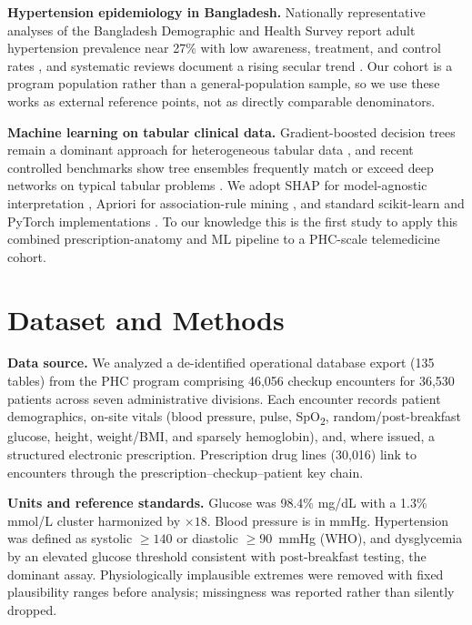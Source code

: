 \documentclass[conference]{IEEEtran}
\begin{document}
\textbf{Hypertension epidemiology in Bangladesh.} Nationally representative analyses of the Bangladesh Demographic and Health Survey report adult hypertension prevalence near 27\% with low awareness, treatment, and control rates \cite{khan2021prevalence,chowdhury2016hypertension}, and systematic reviews document a rising secular trend \cite{chowdhury2020trend,gao2021changes}. Our cohort is a program population rather than a general-population sample, so we use these works as external reference points, not as directly comparable denominators.

\textbf{Machine learning on tabular clinical data.} Gradient-boosted decision trees remain a dominant approach for heterogeneous tabular data \cite{chen2016xgboost}, and recent controlled benchmarks show tree ensembles frequently match or exceed deep networks on typical tabular problems \cite{grinsztajn2022why}. We adopt SHAP for model-agnostic interpretation \cite{lundberg2017unified}, Apriori for association-rule mining \cite{agrawal1994fast}, and standard scikit-learn and PyTorch implementations \cite{pedregosa2011scikit,paszke2019pytorch}. To our knowledge this is the first study to apply this combined prescription-anatomy and ML pipeline to a PHC-scale telemedicine cohort.

\section{Dataset and Methods}
\textbf{Data source.} We analyzed a de-identified operational database export (135 tables) from the PHC program comprising 46{,}056 checkup encounters for 36{,}530 patients across seven administrative divisions. Each encounter records patient demographics, on-site vitals (blood pressure, pulse, SpO\textsubscript{2}, random/post-breakfast glucose, height, weight/BMI, and sparsely hemoglobin), and, where issued, a structured electronic prescription. Prescription drug lines (30{,}016) link to encounters through the prescription--checkup--patient key chain.

\textbf{Units and reference standards.} Glucose was 98.4\% mg/dL with a 1.3\% mmol/L cluster harmonized by $\times18$. Blood pressure is in mmHg. Hypertension was defined as systolic $\geq140$ or diastolic $\geq90$~mmHg (WHO), and dysglycemia by an elevated glucose threshold consistent with post-breakfast testing, the dominant assay. Physiologically implausible extremes were removed with fixed plausibility ranges before analysis; missingness was reported rather than silently dropped.
\end{document}
